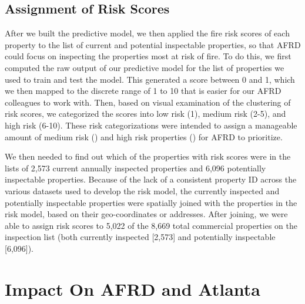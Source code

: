 \documentclass{sig-alternate-05-2015}
\begin{document}
{\subsection{Assignment of Risk Scores}
After we built the predictive model, we then applied the fire risk scores of each property to the list of current and potential inspectable properties, so that AFRD could focus on inspecting the properties most at risk of fire. To do this, we first computed the raw output of our predictive model for the list of  properties we used to train and test the model. 
This generated a score between 0 and 1, which we then mapped to the discrete range of 1 to 10 that is easier for our AFRD colleagues to work with. 
Then, based on visual examination of the clustering of risk scores, we categorized the scores into low risk (1), medium risk (2-5), and high risk (6-10). These risk categorizations were intended to assign a manageable amount of medium risk () and high risk properties () for AFRD to prioritize.  

We then needed to find out which of the  properties with risk scores were in the lists of 2,573 current annually inspected properties and 6,096 potentially inspectable properties. Because of the lack of a consistent property ID across the various datasets used to develop the risk model, the currently inspected and potentially inspectable properties were spatially joined with the properties in the risk model, based on their geo-coordinates or addresses. After joining, we were able to assign risk scores to 5,022 of the 8,669 total commercial properties on the inspection list (both currently inspected [2,573] and potentially inspectable [6,096]).


\section{Impact On AFRD and Atlanta}

}
\end{document}
